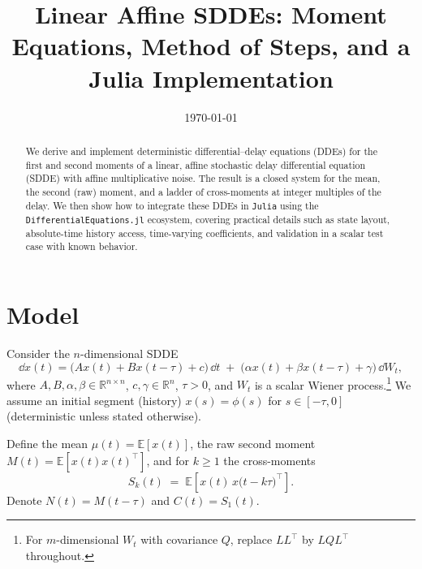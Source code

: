 \documentclass[11pt]{article}
\title{Linear Affine SDDEs: Moment Equations, Method of Steps, and a Julia Implementation}
\author{}
\date{\today}
\begin{document}
\maketitle

\begin{abstract}
We derive and implement deterministic differential--delay equations (DDEs) for the first and second moments of a linear, affine stochastic delay differential equation (SDDE) with affine multiplicative noise. The result is a closed system for the mean, the second (raw) moment, and a ladder of cross-moments at integer multiples of the delay. We then show how to integrate these DDEs in \texttt{Julia} using the \texttt{DifferentialEquations.jl} ecosystem, covering practical details such as state layout, absolute-time history access, time-varying coefficients, and validation in a scalar test case with known behavior.
\end{abstract}

\section{Model}
Consider the $n$-dimensional SDDE
\begin{equation}\label{eq:sdde}
  \dd x(t) = \big(Ax(t) + B x(t-\tau) + c\big)\,\dd t
   \;+\; \big(\alpha x(t) + \beta x(t-\tau) + \gamma\big)\,\dd W_t,
\end{equation}
where $A,B,\alpha,\beta\in\mathbb{R}^{n\times n}$, $c,\gamma\in\mathbb{R}^n$, $\tau>0$, and $W_t$ is a scalar Wiener process.\footnote{For $m$-dimensional $W_t$ with covariance $Q$, replace $LL^\top$ by $LQL^\top$ throughout.} We assume an initial segment (history) $x(s)=\phi(s)$ for $s\in[-\tau,0]$ (deterministic unless stated otherwise).

Define the mean $\mu(t)=\mathbb{E}[x(t)]$, the raw second moment $M(t)=\mathbb{E}[x(t)x(t)^\top]$, and for $k\ge1$ the cross-moments
\begin{equation}
  S_k(t) \;=\; \mathbb{E}\!\left[x(t)\,x\big(t-k\tau\big)^\top\right].
\end{equation}
Denote $N(t)=M(t-\tau)$ and $C(t)=S_1(t)$.
\end{document}
